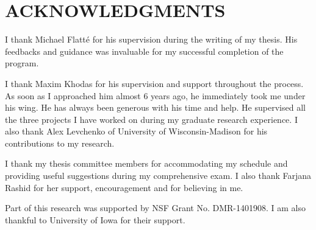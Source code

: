 \chapter*{ACKNOWLEDGMENTS}
{ %
I thank Michael Flatt\'e for his supervision during the writing of my thesis. His feedbacks and guidance was invaluable for my successful completion of the program.

I thank Maxim Khodas for his supervision and support throughout the process. As soon as I approached him almost 6 years ago, he immediately took me under his wing. He has always been generous with his time and help. He supervised all the three projects I have worked on during my graduate research experience. I also thank Alex Levchenko of University of Wisconsin-Madison for his contributions to my research. 

I thank my thesis committee members for accommodating my schedule and providing useful suggestions during my comprehensive exam. I also thank Farjana Rashid for her support, encouragement and for believing in me.

Part of this research was supported by NSF Grant No. DMR-1401908. I am also thankful to University of Iowa for their support.



}



\newpage
	\pagestyle{plain}
	\markboth{\thepage}{\thepage}
        \doublespace
\titleformat{\chapter}[display]   
{\normalfont\large\bfseries\centering}{\chaptertitlename\ \thechapter}{10pt}{\large}   
\titlespacing*{\chapter}{0pt}{-20pt}{25pt}
